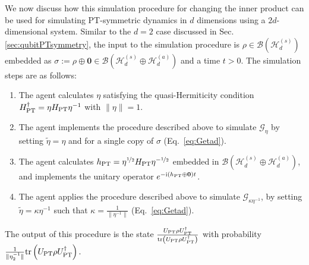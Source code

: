 \documentclass[amsmath,amssymb,aps,pra,superscriptaddress,twocolumn]{revtex4-2}
\begin{document}
\begin{appendix}
We now discuss how this simulation procedure for changing the inner product 
can be used for simulating PT-symmetric dynamics in $d$ dimensions
using a $2d$-dimensional system. Similar to the $d=2$ case discussed in Sec.\,\ref{sec:qubitPTsymmetry}, 
the input to the simulation procedure is $\rho \in \mathcal{B}(\mathscr{H}_d^{(s)})$ 
embedded as $\sigma:= \rho\oplus \bm{0} \in \mathcal{B}(\mathscr{H}_d^{(s)}\oplus\mathscr{H}_d^{(a)})$ and a time $t>0$.
The simulation steps are as follows:
\begin{enumerate}
    \item The agent calculates $\eta$ satisfying the quasi-Hermiticity condition $H^\dagger_{\rm PT} = \eta H_{\rm PT}\eta^{-1}$ with $\|\eta\|=1$.
    \item The agent implements the procedure described above to simulate $\mathcal{G}_{\eta}$ 
    by setting $\tilde{\eta} = \eta$ and
    for a single copy of $\sigma$ (Eq.~\eqref{eq:Getad}). 
    \item The agent calculates $h_{\rm PT} = \eta^{\nicefrac{1}{2}}H_{\rm PT}\eta^{-\nicefrac{1}{2}}$ 
    embedded in $\mathcal{B}(\mathscr{H}_d^{(s)}\oplus\mathscr{H}_d^{(a)})$,
    and implements the unitary operator $e^{-{\rm i}(h_{\rm PT}\oplus \bm{0})t}$.
    \item The agent applies the procedure described above to simulate $\mathcal{G}_{\kappa\eta^{-1}}$, 
    by setting $\tilde{\eta} = \kappa\eta^{-1}$ such that $\kappa = \frac{1}{\|\eta^{-1}\|}$ (Eq.~\eqref{eq:Getad}).
\end{enumerate}
The output of this procedure is the state $\frac{U_{\rm{PT}}\rho U^\dagger_{\rm{PT}}}{{\rm tr}\left( U_{\rm{PT}}\rho U^\dagger_{\rm{PT}}\right)}$
with probability $\frac{1}{\|\eta_2^{-1}\|}{\rm tr}\left( U_{\rm{PT}}\rho U^\dagger_{\rm{PT}}\right).$




\end{appendix}
\end{document}
